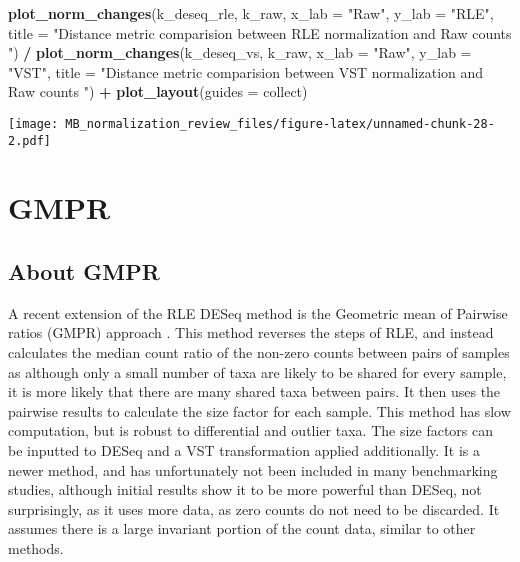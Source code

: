\documentclass[
]{book}
\newenvironment{Shaded}{\begin{snugshade}}{\end{snugshade}}
\newcommand{\DataTypeTok}[1]{\textcolor[rgb]{0.13,0.29,0.53}{#1}}
\newcommand{\KeywordTok}[1]{\textcolor[rgb]{0.13,0.29,0.53}{\textbf{#1}}}
\newcommand{\NormalTok}[1]{#1}
\newcommand{\OperatorTok}[1]{\textcolor[rgb]{0.81,0.36,0.00}{\textbf{#1}}}
\newcommand{\StringTok}[1]{\textcolor[rgb]{0.31,0.60,0.02}{#1}}
\begin{document}
\begin{Shaded}
\begin{Highlighting}[]
\KeywordTok{plot\_norm\_changes}\NormalTok{(k\_deseq\_rle, k\_raw, }
                  \DataTypeTok{x\_lab =} \StringTok{"Raw"}\NormalTok{, }\DataTypeTok{y\_lab =} \StringTok{"RLE"}\NormalTok{, }
                  \DataTypeTok{title =} \StringTok{"Distance metric comparision between RLE normalization and Raw counts "}\NormalTok{) }\OperatorTok{/}\StringTok{ }
\KeywordTok{plot\_norm\_changes}\NormalTok{(k\_deseq\_vs, k\_raw, }
                  \DataTypeTok{x\_lab =} \StringTok{"Raw"}\NormalTok{, }\DataTypeTok{y\_lab =} \StringTok{"VST"}\NormalTok{, }
                  \DataTypeTok{title =} \StringTok{"Distance metric comparision between VST normalization and Raw counts "}\NormalTok{) }\OperatorTok{+}\StringTok{ }
\StringTok{  }\KeywordTok{plot\_layout}\NormalTok{(}\DataTypeTok{guides =} \StringTok{\textquotesingle{}collect\textquotesingle{}}\NormalTok{)}
\end{Highlighting}
\end{Shaded}

\texttt{[image: MB\_normalization\_review\_files/figure-latex/unnamed-chunk-28-2.pdf]}

\hypertarget{gmpr}{%
\section{GMPR}\label{gmpr}}

\hypertarget{about-gmpr}{%
\subsection{About GMPR}\label{about-gmpr}}

A recent extension of the RLE DESeq method is the Geometric mean of Pairwise ratios (GMPR) approach \citep{chen2018}. This method reverses the steps of RLE, and instead calculates the median count ratio of the non-zero counts between pairs of samples as although only a small number of taxa are likely to be shared for every sample, it is more likely that there are many shared taxa between pairs. It then uses the pairwise results to calculate the size factor for each sample. This method has slow computation, but is robust to differential and outlier taxa. The size factors can be inputted to DESeq and a VST transformation applied additionally. It is a newer method, and has unfortunately not been included in many benchmarking studies, although initial results show it to be more powerful than DESeq, not surprisingly, as it uses more data, as zero counts do not need to be discarded. It assumes there is a large invariant portion of the count data, similar to other methods.
\end{document}
